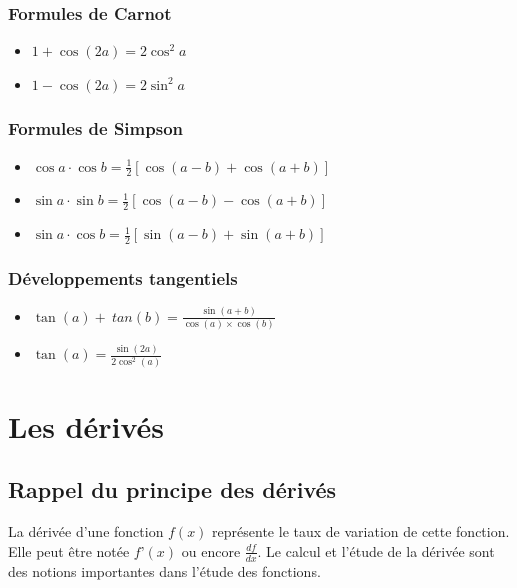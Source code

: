 \documentclass[12]{article}%
\theoremstyle{plain}
\theoremstyle{definition}
\theoremstyle{remark}
\begin{document}
\subsubsection{Formules de Carnot}
\begin{itemize}
	\item \( \boxed{1 + \cos(2a) = 2 \cos^2 a} \)
	\item \( \boxed{1 - \cos(2a) = 2 \sin^2 a} \)
\end{itemize}

\subsubsection{Formules de Simpson}
\begin{itemize}
	\item \( \boxed{\cos a \cdot \cos b = \frac{1}{2} \left[ \cos(a-b) + \cos(a+b) \right]} \)
	\item \( \boxed{\sin a \cdot \sin b = \frac{1}{2} \left[ \cos(a-b) - \cos(a+b) \right]} \)
	\item \( \boxed{\sin a \cdot \cos b = \frac{1}{2} \left[ \sin(a-b) + \sin(a+b) \right]} \)
\end{itemize}

\subsubsection{Développements tangentiels}
\begin{itemize}
	\item \( \boxed{\tan(a) + \ tan(b) = \frac{\sin(a+b)}{\cos(a) \times \cos(b)}} \)
	\item \( \boxed{\tan(a) = \frac{\sin(2a)}{2\cos^{2}(a)}} \)
\end{itemize}

\newpage
\section{Les dérivés}
\subsection{Rappel du principe des dérivés}
La dérivée d’une fonction $f(x)$ représente le taux de variation de cette fonction. Elle peut être notée $f’(x)$ ou encore $\frac{df}{dx}$. Le calcul et l’étude de la dérivée sont des notions importantes dans l’étude des fonctions.
\end{document}
